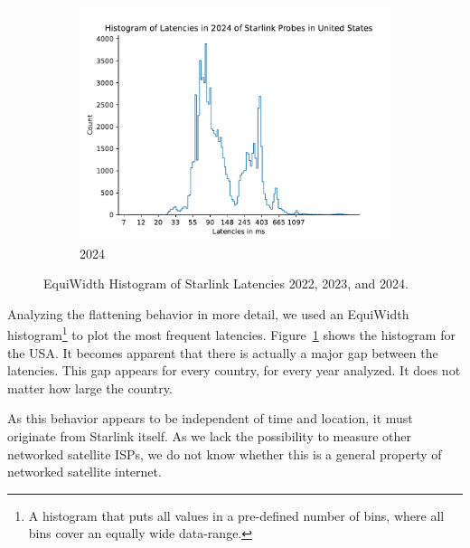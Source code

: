 \begin{figure}
\begin{subfigure}[b]{0.3\linewidth}
		\includegraphics[width=\linewidth]{chapters/4-results/latency/img/histogram_of_latencies_in_2024_of_starlink_probes_in_united_states.pdf}
		\caption{2024}
	\end{subfigure}
	\caption{EquiWidth Histogram of Starlink Latencies 2022, 2023, and 2024.}
	\label{fig:latency-histogram-usa}
\end{figure}

Analyzing the flattening behavior in more detail, we used an EquiWidth
histogram\footnote{A histogram that puts all values in a pre-defined number of
	bins, where all bins cover an equally wide data-range.} to plot the
most frequent latencies. Figure~\ref{fig:latency-histogram-usa} shows the
histogram for the USA. It becomes apparent that there is actually a major gap
between the latencies. This gap appears for every country, for every year
analyzed. It does not matter how large the country.

As this behavior appears to be independent of time and location, it must
originate from Starlink itself. As we lack the possibility to measure other
networked satellite ISPs, we do not know whether this is a general property of
networked satellite internet.


